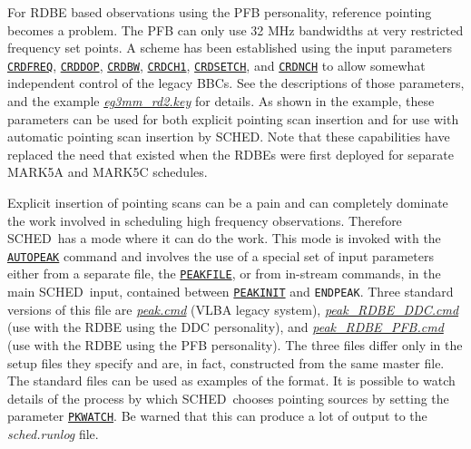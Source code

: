 \documentclass{report}
\newcommand{\sched}{{\sc SCHED}}
\newcommand{\schedb}{{\sc SCHED~}}
\begin{document}
For RDBE based observations using the PFB personality, reference
pointing becomes a problem.  The PFB can only use 32 MHz bandwidths at
very restricted frequency set points.  A scheme has been established
using the input parameters 
{\hyperref[MP:CRDFREQ]{{\tt CRDFREQ}}},
{\hyperref[MP:CRDDOP]{{\tt CRDDOP}}}, 
{\hyperref[MP:CRDBW]{{\tt CRDBW}}},
{\hyperref[MP:CRDCH1]{{\tt CRDCH1}}}, 
{\hyperref[MP:CRDSETCH]{{\tt CRDSETCH}}}, and 
{\hyperref[MP:CRDNCH]{{\tt CRDNCH}}} to
allow somewhat independent control of the legacy BBCs.  See the
descriptions of those parameters, and the example
{\href{examples/eg3mm\_rd2.key}{{\sl eg3mm\_rd2.key}}} for
details.  As shown in the example, these parameters can be used for
both explicit pointing scan insertion and for use with automatic
pointing scan insertion by \sched.  Note that these capabilities have
replaced the need that existed when the RDBEs were first deployed for
separate MARK5A and MARK5C schedules.

Explicit insertion of pointing scans can be a pain and can completely
dominate the work involved in scheduling high frequency observations.
Therefore \schedb has a mode where it can do the work.  This mode is
invoked with the 
{\hyperref[MP:AUTOPEAK]{{\tt AUTOPEAK}}} command and
involves the use of a special set of input parameters either from a
separate file, the 
{\hyperref[MP:PEAKFILE]{{\tt PEAKFILE}}}, or from
in-stream commands, in the main \schedb input, contained between
{\hyperref[MP:PEAKINIT]{{\tt PEAKINIT}}} and {\tt ENDPEAK}.  Three
standard versions of this file are 
{\href{catalogs/peak.cmd}{{\sl peak.cmd}}}
(VLBA legacy system),
{\href{catalogs/peak\_RDBE\_DDC.cmd}{{\sl peak\_RDBE\_DDC.cmd}}}
(use with the RDBE using the DDC personality), and 
{\href{catalogs/peak\_RDBE\_PFB.cmd}{{\sl peak\_RDBE\_PFB.cmd}}}
(use with the RDBE
using the PFB personality).  The three files differ only in the setup
files they specify and are, in fact, constructed from the same master
file.  The standard files can be used as examples of the format.  It
is possible to watch details of the process by which \schedb chooses
pointing sources by setting the parameter 
{\hyperref[MP:PKWATCH]{{\tt PKWATCH}}}.
Be warned that this can produce a lot of
output to the {\sl sched.runlog} file.
\end{document}
